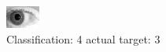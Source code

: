 \begin{figure}[h!]
\begin{center}
\includegraphics[width=0.60\columnwidth]{figures/ID286_class_4_target_3.png}
\end{center}
\caption{ Classification: 4 actual target: 3}
\label{fig:ID286_class_4_target_3}
\end{figure}
